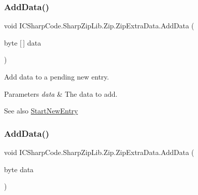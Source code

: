 \subsubsection{\texorpdfstring{Add\+Data()}{AddData()}\hspace{0.1cm}{\footnotesize\ttfamily [2/4]}}
{\footnotesize\ttfamily void I\+C\+Sharp\+Code.\+Sharp\+Zip\+Lib.\+Zip.\+Zip\+Extra\+Data.\+Add\+Data (\begin{DoxyParamCaption}\item[{byte \mbox{[}$\,$\mbox{]}}]{data }\end{DoxyParamCaption})\hspace{0.3cm}{\ttfamily [inline]}}



Add data to a pending new entry. 


\begin{DoxyParams}{Parameters}
{\em data} & The data to add.\\
\hline
\end{DoxyParams}
\begin{DoxySeeAlso}{See also}
\hyperlink{class_i_c_sharp_code_1_1_sharp_zip_lib_1_1_zip_1_1_zip_extra_data_a3fd5ac216b1b6a0fe5ae92ea8156f20a}{Start\+New\+Entry}


\end{DoxySeeAlso}
\mbox{\label{class_i_c_sharp_code_1_1_sharp_zip_lib_1_1_zip_1_1_zip_extra_data_a5a4382d76458422b6e5c9c353430eaa8}} 
\subsubsection{\texorpdfstring{Add\+Data()}{AddData()}\hspace{0.1cm}{\footnotesize\ttfamily [3/4]}}
{\footnotesize\ttfamily void I\+C\+Sharp\+Code.\+Sharp\+Zip\+Lib.\+Zip.\+Zip\+Extra\+Data.\+Add\+Data (\begin{DoxyParamCaption}\item[{byte}]{data }\end{DoxyParamCaption})\hspace{0.3cm}{\ttfamily [inline]}}



